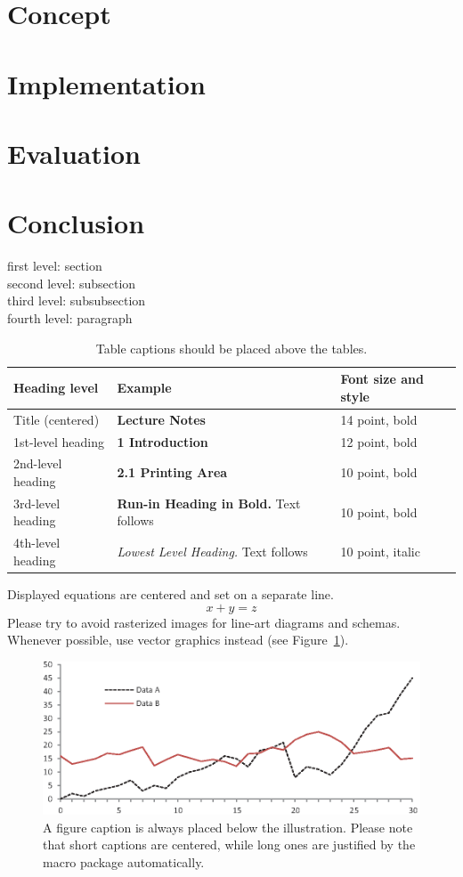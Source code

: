 \section{Concept}
\section{Implementation}
\section{Evaluation}
\section{Conclusion}




first level: section\\
second level: subsection\\
third level: subsubsection\\
fourth level: paragraph

\begin{table}[tbh!]
\caption{Table captions should be placed above the
tables.}\label{tab1}
\begin{tabular}{lll}
\hline
Heading level &  Example & Font size and style\\
\hline
Title (centered) &  {\Large\bfseries Lecture Notes} & 14 point, bold\\
1st-level heading &  {\large\bfseries 1 Introduction} & 12 point, bold\\
2nd-level heading & {\bfseries 2.1 Printing Area} & 10 point, bold\\
3rd-level heading & {\bfseries Run-in Heading in Bold.} Text follows & 10 point, bold\\
4th-level heading & {\itshape Lowest Level Heading.} Text follows & 10 point, italic\\
\hline
\end{tabular}
\end{table}
Displayed equations are centered and set on a separate line.
\begin{equation}
x + y = z
\end{equation}
Please try to avoid rasterized images for line-art diagrams and
schemas. Whenever possible, use vector graphics instead (see
Figure~\ref{fig1}).

\begin{figure}[tbh!]
\includegraphics[width=\textwidth]{fig1.eps}
\caption{A figure caption is always placed below the illustration.
Please note that short captions are centered, while long ones are
justified by the macro package automatically.} \label{fig1}
\end{figure}
